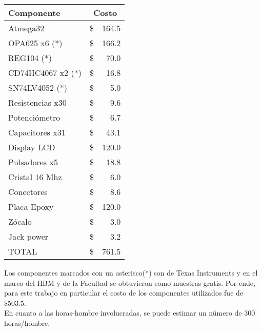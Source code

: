 \begin{table}[H]
\begin{center}
\begin{tabular}{|l|rr|}
    \hline
    \textbf{Componente} & \multicolumn{2}{c|}{\textbf{Costo}} \\ \hline
    Atmega32            & \hspace{2.8cm}\$ &   164.5 \\ \hline
    OPA625 x6 (*)       & \$               &   166.2 \\ \hline
    REG104 (*)          & \$               &   70.0 \\ \hline
    CD74HC4067 x2 (*)   & \$               &   16.8 \\ \hline
    SN74LV4052 (*)      & \$               &   5.0 \\ \hline
    Resistencias x30    & \$               &   9.6 \\ \hline
    Potenciómetro       & \$               &   6.7 \\ \hline
    Capacitores x31     & \$               &   43.1 \\ \hline
    Display LCD         & \$               &   120.0 \\ \hline
    Pulsadores x5       & \$               &   18.8 \\ \hline
    Cristal 16 Mhz      & \$               &   6.0 \\ \hline
    Conectores          & \$               &   8.6 \\ \hline
    Placa Epoxy         & \$               &   120.0 \\ \hline
    Zócalo              & \$               &   3.0 \\ \hline
    Jack power          & \$               &   3.2 \\ \hline
    TOTAL               & \$               &   761.5 \\ \hline
\end{tabular}
\end{center}
\end{table}

Los componentes marcados con un asterisco(*) son de Texas Instruments y en el marco del IIBM y de la Facultad se obtuvieron como muestras gratis. Por ende, para este trabajo en particular el costo de los componentes utilizados fue de $\$ 503.5$.\\

En cuanto a las horas-hombre involucradas, se puede estimar un número de 300 horas/hombre.



